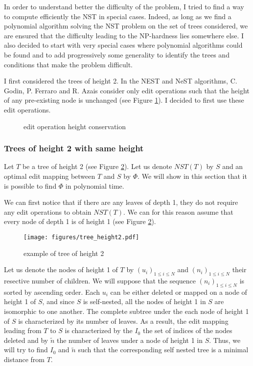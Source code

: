 In order to understand better the difficulty of the problem, I tried
to find a way to compute efficiently the NST in special cases. Indeed,
as long as we find a polynomial algorithm solving the NST problem on
the set of trees considered, we are ensured that the difficulty
leading to the NP-hardness lies somewhere else. I also decided to
start with very special cases where polynomial algorithms could be found
and to add progressively some generality to identify the trees and
conditions that make the problem difficult. 

I first considered the trees of height 2. In the NEST and NeST
algorithms, C. Godin, P. Ferraro and R. Azais consider only edit
operations such that the height of any pre-existing node is unchanged
(see Figure \ref{fig:edit_height}). I decided to first use these edit
operations.
\begin{figure}
  \centering
  \caption{edit operation height conservation}
  \label{fig:edit_height}
\end{figure}

\subsubsection{Trees of height 2 with same height} 
Let $T$ be a tree of height 2 (see Figure \ref{fig:height2}). Let us
denote $NST(T)$ by $S$ and an optimal edit mapping between $T$ and $S$
by $\Phi$. We will show in this section that it is possible to find
$\Phi$ in polynomial time.  

We can first notice that if there are any leaves of depth 1, they do
not require any edit operations to obtain $NST(T)$. We can for this
reason assume that every node of depth 1 is of height 1 (see Figure
\ref{fig:height2}).

\begin{figure}
  \centering
  \texttt{[image: figures/tree\_height2.pdf]}

  \caption{example of tree of height 2}
  \label{fig:height2}
\end{figure}

Let us denote the nodes of height 1 of $T$ by
$(u_{i})_{1 \leqslant i \leqslant N}$ and
$(n_{i})_{1 \leqslant i \leqslant N}$ their resective number of
children. We will suppose that the sequence
$(n_{i})_{1 \leqslant i \leqslant N}$ is sorted by ascending
order. Each $u_{i}$ can be either deleted or mapped on a node of
height 1 of $S$, and since $S$ is self-nested, all the nodes of height
1 in $S$ are isomorphic to one another. The complete subtree under the
each node of height 1 of $S$ is characterized by its number of
leaves. As a result, the edit mapping leading from $T$ to $S$ is
characterized by the $I_{0}$ the set of indices of the nodes deleted
and by $\tilde{n}$ the number of leaves under a node of height 1 in
$S$. Thus, we will try to find $I_{0}$ and $\tilde{n}$ such that the
corresponding self nested tree is a minimal distance from $T$.

